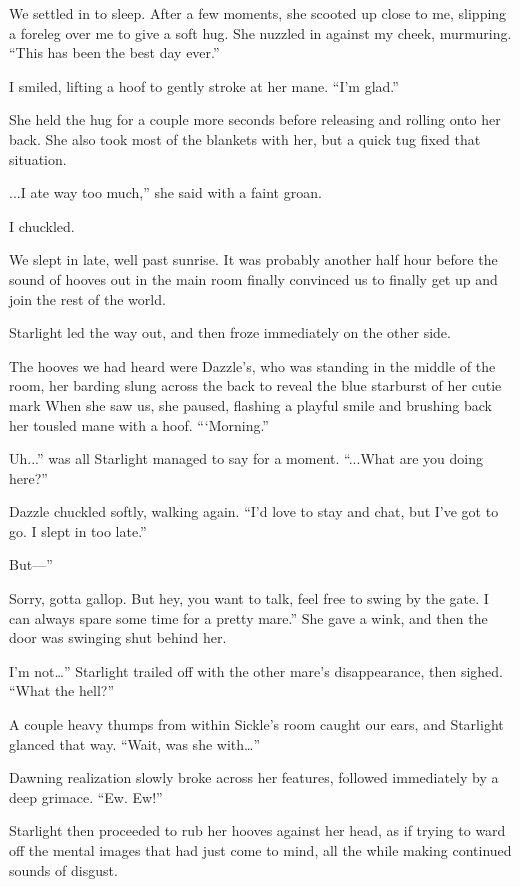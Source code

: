 We settled in to sleep. After a few moments, she scooted up close to me, slipping a foreleg over me to give a soft hug. She nuzzled in against my cheek, murmuring. “This has been the best day ever.”

I smiled, lifting a hoof to gently stroke at her mane. “I’m glad.”

She held the hug for a couple more seconds before releasing and rolling onto her back. She also took most of the blankets with her, but a quick tug fixed that situation.

\leavevmode{}...I ate way too much,” she said with a faint groan.

I chuckled.

{\br}%
We slept in late, well past sunrise. It was probably another half hour before the sound of hooves out in the main room finally convinced us to finally get up and join the rest of the world.

Starlight led the way out, and then froze immediately on the other side.

The hooves we had heard were Dazzle’s, who was standing in the middle of the room, her barding slung across the back to reveal the blue starburst of her cutie mark When she saw us, she paused, flashing a playful smile and brushing back her tousled mane with a hoof. “‘Morning.”

\leavevmode{}Uh...” was all Starlight managed to say for a moment. “...What are you doing here?”

Dazzle chuckled softly, walking again. “I’d love to stay and chat, but I’ve got to go. I slept in too late.”

\leavevmode{}But—”

\leavevmode{}Sorry, gotta gallop. But hey, you want to talk, feel free to swing by the gate. I can always spare some time for a pretty mare.” She gave a wink, and then the door was swinging shut behind her.

\leavevmode{}I’m not…” Starlight trailed off with the other mare’s disappearance, then sighed. “What the hell?”

A couple heavy thumps from within Sickle’s room caught our ears, and Starlight glanced that way. “Wait, was she with…”

Dawning realization slowly broke across her features, followed immediately by a deep grimace. “Ew. Ew!”

Starlight then proceeded to rub her hooves against her head, as if trying to ward off the mental images that had just come to mind, all the while making continued sounds of disgust.

